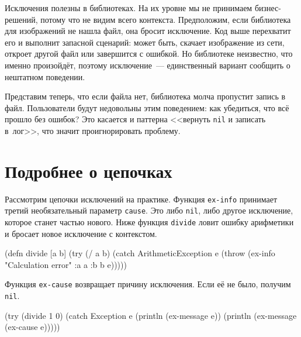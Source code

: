 \fi

Исключения полезны в библиотеках. На их уровне мы не принимаем бизнес-решений,
потому что не видим всего контекста. Предположим, если библиотека для
изображений не нашла файл, она бросит исключение. Код выше перехватит его и
выполнит запасной сценарий: может быть, скачает изображение из сети, откроет
другой файл или завершится с ошибкой. Но библиотеке неизвестно, что именно
произойдёт, поэтому исключение~--- единственный вариант сообщить о нештатном
поведении.

Представим теперь, что если файла нет, библиотека молча пропустит запись в
файл. Пользователи будут недовольны этим поведением: как убедиться, что всё
прошло без ошибок? Это касается и паттерна <<вернуть \verb|nil| и записать
в~лог>>, что значит проигнорировать проблему.

\section{Подробнее о цепочках}


Рассмотрим цепочки исключений на практике. Функция \verb|ex-info|
принимает третий необязательный параметр \verb|cause|. Это либо \verb|nil|,
либо другое исключение, которое станет частью нового. Ниже функция
\verb|divide| ловит ошибку арифметики и бросает новое исключение с контекстом.

\pagebreakafive


\label{re-throw-example}

\begin{english}
  \begin{clojure}
(defn divide [a b]
  (try
    (/ a b)
    (catch ArithmeticException e
      (throw (ex-info
               "Calculation error"
               {:a a :b b}
               e)))))
  \end{clojure}
\end{english}

Функция \verb|ex-cause| возвращает причину исключения. Если её не было,
получим \verb|nil|.

\ifnarrow

\begin{english}
  \begin{clojure}
(try
  (divide 1 0)
  (catch Exception e
    (println (ex-message e))
    (println (ex-message
               (ex-cause e)))))
  \end{clojure}
\end{english}

